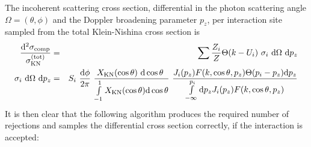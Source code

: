 The incoherent scattering cross section, differential in
the photon scattering angle $\Omega = (\theta,\phi)$
and the Doppler broadening
parameter $p_z$, per interaction site sampled from the
total Klein-Nishina cross section is
\begin{eqnarray}
{{\rm d}^2 \sigma_{\rm comp} \over \sigma_{\rm KN}^{\rm (tot)}} & = &
\sum \frac{Z_i}{Z} \Theta(k - U_i)~ \sigma_i~ {\rm d} \Omega~ {\rm d} p_z
\\
\sigma_i~ {\rm d} \Omega~ {\rm d} p_z & = &
S_i~
{{\rm d} \phi \over 2 \pi}~
{X_{\rm KN}(\cos \theta)~{\rm d} \cos \theta~ \over
\int\limits_{-1}^1 X_{\rm KN}(\cos \theta) {\rm d} \cos \theta }
~{ J_i(p_z) F(k,\cos \theta,p_z) \Theta(p_i - p_z) {\rm d} p_z \over
\int\limits_{-\infty}^{p_i} {\rm d} p_z J_i(p_z) F(k,\cos \theta,p_z) }
\nonumber
\end{eqnarray}
It is then clear that the following algorithm produces the
required number of rejections and samples the differential
cross section correctly, if the interaction is accepted:
